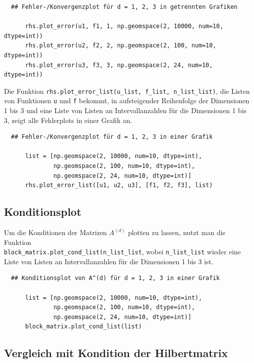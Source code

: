 \documentclass{scrartcl}
\begin{document}
\begin{verbatim}
  ## Fehler-/Konvergenzplot für d = 1, 2, 3 in getrennten Grafiken

      rhs.plot_error(u1, f1, 1, np.geomspace(2, 10000, num=10, dtype=int))
      rhs.plot_error(u2, f2, 2, np.geomspace(2, 100, num=10, dtype=int))
      rhs.plot_error(u3, f3, 3, np.geomspace(2, 24, num=10, dtype=int))
\end{verbatim}

Die Funktion \texttt{rhs.plot\_error\_list(u\_list, f\_list, n\_list\_list)}, die Listen von Funktionen \texttt{u} und \texttt{f} bekommt, in aufsteigender Reihenfolge der Dimensionen 1 bis 3 und eine Liste von Listen an Intervallanzahlen für die Dimensionen 1 bis 3, zeigt alle Fehlerplots in einer Grafik an.

\begin{verbatim}
  ## Fehler-/Konvergenzplot für d = 1, 2, 3 in einer Grafik

      list = [np.geomspace(2, 10000, num=10, dtype=int),
              np.geomspace(2, 100, num=10, dtype=int),
              np.geomspace(2, 24, num=10, dtype=int)]
      rhs.plot_error_list([u1, u2, u3], [f1, f2, f3], list)
\end{verbatim}

\subsection{Konditionsplot}

Um die Konditionen der Matrizen $A^{(d)}$ plotten zu lassen, nutzt man die Funktion \\\texttt{block\_matrix.plot\_cond\_list(n\_list\_list}, wobei \texttt{n\_list\_list} wieder eine Liste von Listen an Intervallanzahlen für die Dimensionen 1 bis 3 ist.

\begin{verbatim}
  ## Konditionsplot von A^(d) für d = 1, 2, 3 in einer Grafik

      list = [np.geomspace(2, 10000, num=10, dtype=int),
              np.geomspace(2, 100, num=10, dtype=int),
              np.geomspace(2, 24, num=10, dtype=int)]
      block_matrix.plot_cond_list(list)
\end{verbatim}

\subsection{Vergleich mit Kondition der Hilbertmatrix}
\end{document}
